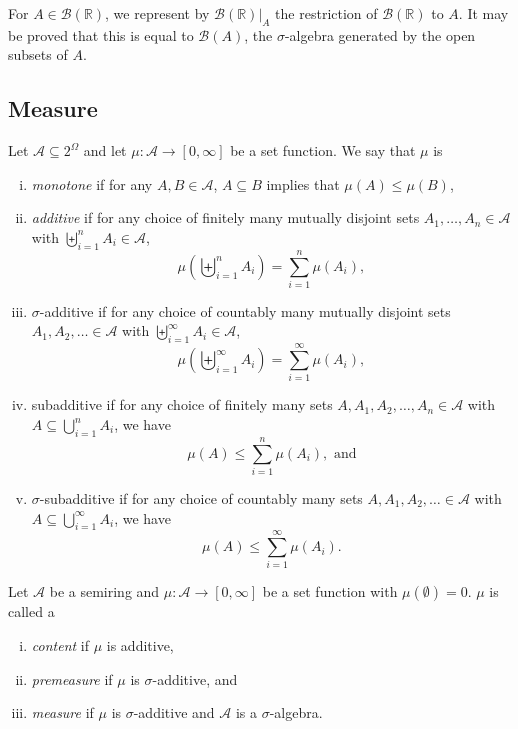 \vspace{2mm}
For $A\in\mathcal{B}(\mathbb{R})$, we represent by $\left.\mathcal{B}(\mathbb{R})\right|_{A}$ the restriction of $\mathcal{B}(\mathbb{R})$ to $A$. It may be proved that this is equal to $\mathcal{B}(A)$, the $\sigma$-algebra generated by the open subsets of $A$.

\subsection{Measure}

\begin{definition}
    Let $\mathcal{A}\subseteq2^\Omega$ and let $\mu:\mathcal{A}\to[0,\infty]$ be a set function. We say that $\mu$ is
    \begin{enumerate}[(i)]
        \item \textit{monotone} if for any $A,B\in\mathcal{A}$, $A\subseteq B$ implies that $\mu(A)\leq\mu(B)$,
        
        \item \textit{additive} if for any choice of finitely many mutually disjoint sets $A_1,\ldots,A_n\in\mathcal{A}$ with $\biguplus_{i=1}^n A_i\in\mathcal{A}$,
        $$\mu\left(\biguplus_{i=1}^nA_i\right)=\sum_{i=1}^n\mu(A_i),$$
        
        \item $\sigma$-additive if for any choice of countably many mutually disjoint sets $A_1,A_2,\ldots\in\mathcal{A}$ with $\biguplus_{i=1}^\infty A_i\in\mathcal{A}$,
        $$\mu\left(\biguplus_{i=1}^\infty A_i\right)=\sum_{i=1}^\infty\mu(A_i),$$
        
        \item subadditive if for any choice of finitely many sets $A,A_1,A_2,\ldots,A_n\in\mathcal{A}$ with $A\subseteq\bigcup_{i=1}^nA_i$, we have $$\mu(A)\leq\sum_{i=1}^n\mu(A_i),\text{ and}$$
        
        \item $\sigma$-subadditive if for any choice of countably many sets $A,A_1,A_2,\ldots\in\mathcal{A}$ with $A\subseteq\bigcup_{i=1}^\infty A_i$, we have
        $$\mu(A)\leq\sum_{i=1}^\infty \mu(A_i).$$
    \end{enumerate}
\end{definition}

\begin{definition}
\label{measureDef}
    Let $\mathcal{A}$ be a semiring and $\mu:\mathcal{A}\to[0,\infty]$ be a set function with $\mu(\emptyset)=0$. $\mu$ is called a
    \begin{enumerate}[(i)]
        \item \textit{content} if $\mu$ is additive,
        \item \textit{premeasure} if $\mu$ is $\sigma$-additive, and
        \item \textit{measure} if $\mu$ is $\sigma$-additive and $\mathcal{A}$ is a $\sigma$-algebra.
    \end{enumerate}
\end{definition}


